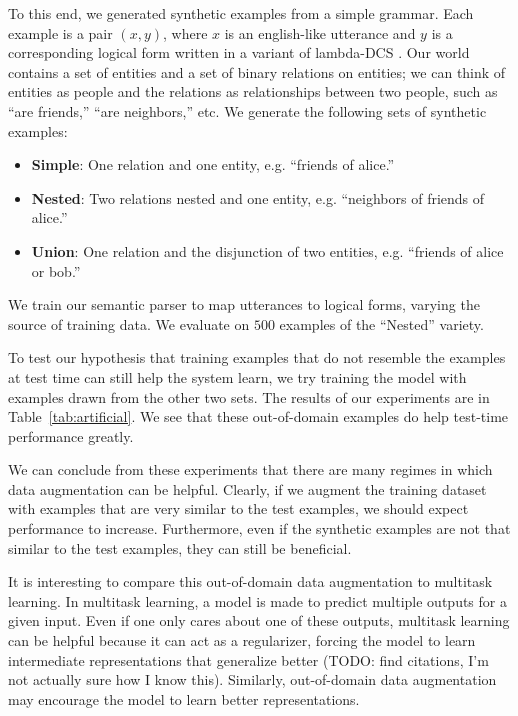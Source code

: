 \documentclass[11pt,letterpaper]{article}
\begin{document}
To this end, we generated synthetic examples from a simple grammar.
Each example is a pair $(x, y)$, where
$x$ is an english-like utterance and $y$ is a corresponding
logical form written in a variant of lambda-DCS \cite{liang2013lambdadcs}.
Our world contains a set of entities and a set of binary relations
on entities; we can think of entities as people
and the relations as relationships between two people, such as ``are friends,''
``are neighbors,'' etc.  
We generate the following sets of synthetic examples:
\begin{itemize}
  \item \textbf{Simple}: One relation and one entity, 
    e.g. ``friends of alice.''
  \item \textbf{Nested}: Two relations nested and one entity, 
    e.g. ``neighbors of friends of alice.''
  \item \textbf{Union}: One relation and the disjunction of two entities,
    e.g. ``friends of alice or bob.''
\end{itemize} 
We train our semantic parser to map utterances to logical forms,
varying the source of training data.
We evaluate on $500$ examples of the ``Nested'' variety.

To test our hypothesis that training examples that do not resemble
the examples at test time can still help the system learn,
we try training the model with examples drawn from the other two sets.
The results of our experiments are in Table~\ref{tab:artificial}.
We see that these out-of-domain examples
do help test-time performance greatly.

We can conclude from these experiments that there are many regimes
in which data augmentation can be helpful.
Clearly, if we augment the training dataset with examples that
are very similar to the test examples, we should expect performance to increase.
Furthermore, even if the synthetic examples are not that similar
to the test examples, they can still be beneficial.

It is interesting to compare this out-of-domain data augmentation
to multitask learning.
In multitask learning, a model is made to predict multiple outputs for a given input.
Even if one only cares about one of these outputs,
multitask learning can be helpful because it can act as a regularizer,
forcing the model to learn intermediate representations that generalize
better (TODO: find citations, I'm not actually sure how I know this).
Similarly, out-of-domain data augmentation may encourage
the model to learn better representations.
\end{document}
